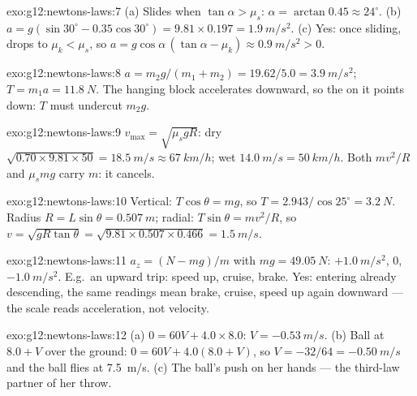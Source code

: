\begin{solution}{exo:g12:newtons-laws:7}
(a) Slides when $\tan\alpha > \mu_s$: $\alpha = \arctan 0.45 \approx
24^\circ$. (b) $a = g(\sin 30^\circ - 0.35\cos 30^\circ) =
9.81 \times 0.197 = \qty{1.9}{m/s^2}$. (c) Yes: once sliding,
 drops to $\mu_k < \mu_s$, so
$a = g\cos\alpha\,(\tan\alpha - \mu_k) \approx \qty{0.9}{m/s^2} > 0$.
\end{solution}

\begin{solution}{exo:g12:newtons-laws:8}
$a = m_2 g/(m_1 + m_2) = 19.62/5.0 = \qty{3.9}{m/s^2}$;
$T = m_1 a = \qty{11.8}{N}$. The hanging block accelerates downward,
so the  on it points down: $T$ must undercut $m_2 g$.
\end{solution}

\begin{solution}{exo:g12:newtons-laws:9}
$v_{\max} = \sqrt{\mu_s g R}$: dry
$\sqrt{0.70 \times 9.81 \times 50} = \qty{18.5}{m/s} \approx
\qty{67}{km/h}$; wet $\qty{14.0}{m/s} = \qty{50}{km/h}$. Both
$mv^2/R$ and $\mu_s mg$ carry $m$: it cancels.
\end{solution}

\begin{solution}{exo:g12:newtons-laws:10}
Vertical: $T\cos\theta = mg$, so
$T = 2.943/\cos 25^\circ = \qty{3.2}{N}$. Radius $R = L\sin\theta =
\qty{0.507}{m}$; radial: $T\sin\theta = mv^2/R$, so
$v = \sqrt{gR\tan\theta} = \sqrt{9.81 \times 0.507 \times 0.466}
= \qty{1.5}{m/s}$.
\end{solution}

\begin{solution}{exo:g12:newtons-laws:11}
$a_z = (N - mg)/m$ with $mg = \qty{49.05}{N}$: $+\qty{1.0}{m/s^2}$,
$0$, $-\qty{1.0}{m/s^2}$. E.g.\ an upward trip: speed up, cruise,
brake. Yes: entering already descending, the same readings mean brake,
cruise, speed up again downward --- the scale reads acceleration, not
velocity.
\end{solution}

\begin{solution}{exo:g12:newtons-laws:12}
(a) $0 = 60V + 4.0 \times 8.0$: $V = \qty{-0.53}{m/s}$.
(b) Ball at $8.0 + V$ over the ground: $0 = 60V + 4.0(8.0 + V)$, so
$V = -32/64 = \qty{-0.50}{m/s}$ and the ball flies at \qty{7.5}{m/s}.
(c) The ball's push on her hands --- the third-law partner of her
throw.
\end{solution}

